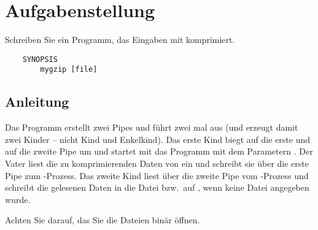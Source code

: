 




\section*{Aufgabenstellung}

Schreiben Sie ein Programm, das Eingaben mit  komprimiert.

\begin{verbatim}
    SYNOPSIS
        mygzip [file]
\end{verbatim}

\subsection*{Anleitung}

Das Programm erstellt zwei Pipes und führt zwei mal  aus (und
erzeugt damit zwei Kinder -- nicht Kind und Enkelkind). Das erste Kind biegt
 auf die erste und  auf die zweite Pipe um
und startet mit  das Programm  mit dem
Parametern . Der Vater liest die zu komprimierenden Daten von
 ein und schreibt sie über die erste Pipe zum
-Prozess. Das zweite Kind liest über die zweite Pipe vom
-Prozess und schreibt die gelesenen Daten in die Datei
 bzw.\ auf , wenn keine Datei angegeben
wurde.

Achten Sie darauf, das Sie die Dateien binär öffnen.

\osueguidelinestwo


